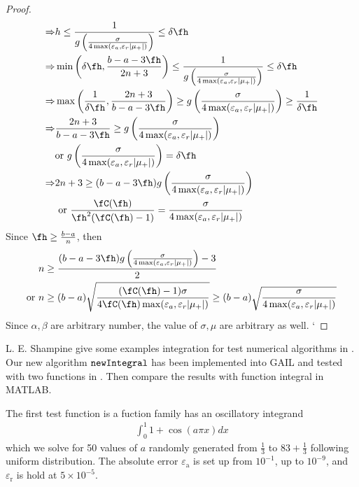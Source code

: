 \documentclass{iitthesis}
\DeclareMathOperator{\newinteg}{\texttt{\textup{newIntegral}}}
\newcommand{\hcut}{\fh}
\newcommand{\abstol}{\varepsilon_{\textrm{a}}}
\newcommand{\reltol}{\varepsilon_{\textrm{r}}}
\begin{document}
\begin{proof}
\begin{align*}
\Rightarrow& h\le \frac{1}{g\left(\frac{\sigma}{4\max(\varepsilon_{a},\varepsilon_{r}|\mu_+|)}\right)}\le \delta\hcut\\
\Rightarrow &\min\left(\delta\hcut,\frac{b-a-3\hcut}{2n+3}\right)\le \frac{1}{g\left(\frac{\sigma}{4\max(\varepsilon_{a},\varepsilon_{r}|\mu_+|)}\right)}\le \delta\hcut\\
\Rightarrow&\max\left(\frac{1}{\delta\hcut},\frac{2n+3}{b-a-3\hcut}\right)\ge g\left(\frac{\sigma}{4\max(\varepsilon_{a},\varepsilon_{r}|\mu_+|)}\right)\ge \frac{1}{\delta\hcut}\\
\Rightarrow&\frac{2n+3}{b-a-3\hcut}\ge g\left(\frac{\sigma}{4\max(\varepsilon_{a},\varepsilon_{r}|\mu_+|)}\right)\\
& \text{or } g\left(\frac{\sigma}{4\max(\varepsilon_{a},\varepsilon_{r}|\mu_+|)}\right)=\delta\hcut\\
\Rightarrow &2n+3\ge (b-a-3\hcut)g\left(\frac{\sigma}{4\max(\varepsilon_{a},\varepsilon_{r}|\mu_+|)}\right) \\
&\text{ or }\frac{\fC(\hcut)}{\hcut^2(\fC(\hcut)-1)}=\frac{\sigma}{4\max(\varepsilon_{a},\varepsilon_{r}|\mu_+|)}
\end{align*}
Since $ \hcut\ge \frac{b-a}{n}$, then
\begin{align*}
&n \ge \frac{(b-a-3\hcut)g\left(\frac{\sigma}{4\max(\varepsilon_{a},\varepsilon_{r}|\mu_+|)}\right)-3}{2}\\
\text{or }& n \ge(b-a){\sqrt{\frac{(\fC(\hcut)-1)\sigma}{4\fC(\hcut)\max(\varepsilon_{a},\varepsilon_{r}|\mu_+|)}}}\ge (b-a){\sqrt{\frac{\sigma}{4\max(\varepsilon_{a},\varepsilon_{r}|\mu_+|)}}}
\end{align*}
Since $\alpha,\beta$ are arbitrary number, the value of $\sigma,\mu$ are arbitrary as well. `
\end{proof}


L. E. Shampine give some examples integration for test numerical algorithms in \cite{LFS}. Our  new algorithm $\newinteg$ has been implemented into GAIL \cite{GAIL} and tested with two functions in \cite{LFS}. Then compare the results with function integral in MATLAB.

The first test function is a fuction family has an oscillatory integrand
\begin{align*}
\int_{0}^{1} 1+\cos(a \pi x) dx
\end{align*}
which we solve for 50 values of $a$ randomly generated from $\frac{1}{3}$ to $83+\frac{1}{3}$ following uniform distribution. The absolute error $\abstol$ is set up from  $10^{-1}$, up to $10^{-9}$, and $\reltol$ is hold at $5 \times 10^{-5}$.
\end{document}
